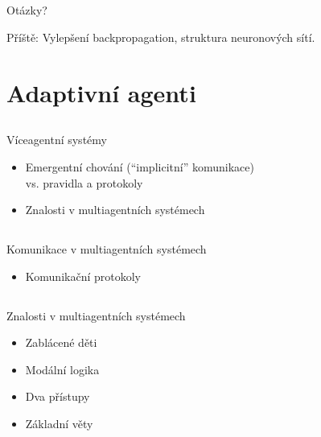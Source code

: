 \documentclass{beamer}
\begin{document}
\subsection{}
\begin{frame}{Otázky?}
\begin{center}
Příště: Vylepšení backpropagation, struktura neuronových sítí.
\end{center}
\end{frame}

\section{Adaptivní agenti}

\subsection{}
\begin{frame}{Víceagentní systémy}
\begin{itemize}
\item Emergentní chování (``implicitní'' komunikace) \\ vs. pravidla a protokoly
\item Znalosti v multiagentních systémech
\end{itemize}
\end{frame}

\subsection{}
\begin{frame}{Komunikace v multiagentních systémech}
\begin{itemize}
\item Komunikační protokoly
\end{itemize}
\end{frame}

\subsection{}
\begin{frame}{Znalosti v multiagentních systémech}
\begin{itemize}
\item Zablácené děti
\item Modální logika
\item Dva přístupy
\item Základní věty
\end{itemize}
\end{frame}
\end{document}
